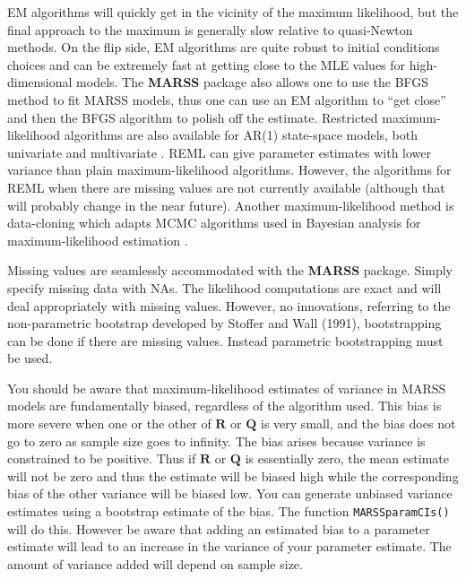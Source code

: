 \documentclass[12pt,]{book}
\begin{document}
EM algorithms will quickly get in the vicinity of the maximum likelihood, but the final approach to the maximum is generally slow relative to quasi-Newton methods. On the flip side, EM algorithms are quite robust to initial conditions choices and can be extremely fast at getting close to the MLE values for high-dimensional models. The \textbf{MARSS} package also allows one to use the BFGS method to fit MARSS models, thus one can use an EM algorithm to ``get close'' and then the BFGS algorithm to polish off the estimate. Restricted maximum-likelihood algorithms are also available for AR(1) state-space models, both univariate \citep{Staplesetal2004} and multivariate \citep{HinrichsenHolmes2009}. REML can give parameter estimates with lower variance than plain maximum-likelihood algorithms. However, the algorithms for REML when there are missing values are not currently available (although that will probably change in the near future). Another maximum-likelihood method is data-cloning which adapts MCMC algorithms used in Bayesian analysis for maximum-likelihood estimation \citep{Leleetal2007}.

Missing values are seamlessly accommodated with the \textbf{MARSS} package. Simply specify missing data with NAs. The likelihood computations are exact and will deal appropriately with missing values. However, no innovations, referring to the non-parametric bootstrap developed by Stoffer and Wall (1991), bootstrapping can be done if there are missing values. Instead parametric bootstrapping must be used.

You should be aware that maximum-likelihood estimates of variance in MARSS models are fundamentally biased, regardless of the algorithm used. This bias is more severe when one or the other of \(\mathbf{R}\) or \(\mathbf{Q}\) is very small, and the bias does not go to zero as sample size goes to infinity. The bias arises because variance is constrained to be positive. Thus if \(\mathbf{R}\) or \(\mathbf{Q}\) is essentially zero, the mean estimate will not be zero and thus the estimate will be biased high while the corresponding bias of the other variance will be biased low. You can generate unbiased variance estimates using a bootstrap estimate of the bias. The function \texttt{MARSSparamCIs()} will do this. However be aware that adding an estimated bias to a parameter estimate will lead to an increase in the variance of your parameter estimate. The amount of variance added will depend on sample size.
\end{document}
